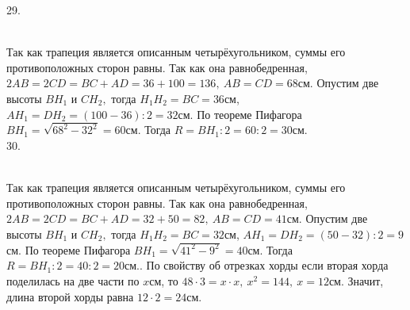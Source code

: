 \documentclass[12pt]{article}
\begin{document}
29. \begin{figure}[ht!]
\end{figure}\\
Так как трапеция является описанным четырёхугольником, суммы его противоположных сторон равны. Так как она равнобедренная, $2AB=2CD=BC+AD=36+100=136,\ AB=CD=68$см. Опустим две высоты $BH_1$ и $CH_2,$ тогда $H_1H_2=BC=36$см, $AH_1=DH_2=(100-36):2=32$см. По теореме Пифагора $BH_1=\sqrt{68^2-32^2}=60$см. Тогда $R=BH_1:2=60:2=30$см.\\
30. \begin{figure}[ht!]
\end{figure}\\
Так как трапеция является описанным четырёхугольником, суммы его противоположных сторон равны. Так как она равнобедренная, $2AB=2CD=BC+AD=32+50=82,\ AB=CD=41$см. Опустим две высоты $BH_1$ и $CH_2,$ тогда $H_1H_2=BC=32$см, $AH_1=DH_2=(50-32):2=9$см. По теореме Пифагора $BH_1=\sqrt{41^2-9^2}=40$см. Тогда $R=BH_1:2=40:2=20$см.\newpage{}. По свойству об отрезках хорды если вторая хорда поделилась на две части по $x$см, то $48\cdot3=x\cdot x,\ x^2=144,\ x=12$см. Значит, длина второй хорды равна $12\cdot2=24$см.\\
\end{document}
